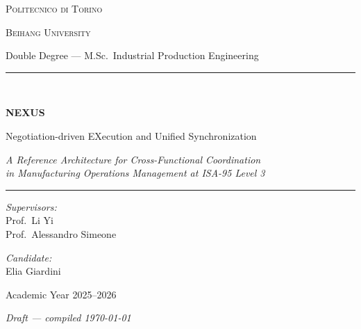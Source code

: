 \documentclass[12pt,a4paper,oneside]{report}
\begin{document}
\begin{titlepage}
\centering
\vspace*{1.2cm}
{\large\scshape Politecnico di Torino\par}
{\large\scshape Beihang University\par}
\vspace{0.4cm}
{\normalsize Double Degree --- M.Sc.\ Industrial Production Engineering\par}
\vspace{1.6cm}
\rule{\textwidth}{0.4pt}\\[0.5cm]
{\Huge\bfseries NEXUS\par}
\vspace{0.5cm}
{\large Negotiation-driven EXecution and Unified Synchronization\par}
\vspace{0.3cm}
{\large\itshape A Reference Architecture for Cross-Functional Coordination\\
in Manufacturing Operations Management at ISA-95 Level 3\par}
\vspace{0.4cm}
\rule{\textwidth}{0.4pt}
\vspace{1.8cm}

\begin{minipage}{0.45\textwidth}
\begin{flushleft}\large
\textit{Supervisors:}\\
Prof.\ Li Yi\\
Prof.\ Alessandro Simeone
\end{flushleft}
\end{minipage}
\hfill
\begin{minipage}{0.45\textwidth}
\begin{flushright}\large
\textit{Candidate:}\\
Elia Giardini
\end{flushright}
\end{minipage}

\vfill
{\large Academic Year 2025--2026\par}
\vspace{0.4cm}
{\normalsize\itshape Draft --- compiled \today\par}
\end{titlepage}

\setcounter{page}{2}
\end{document}
